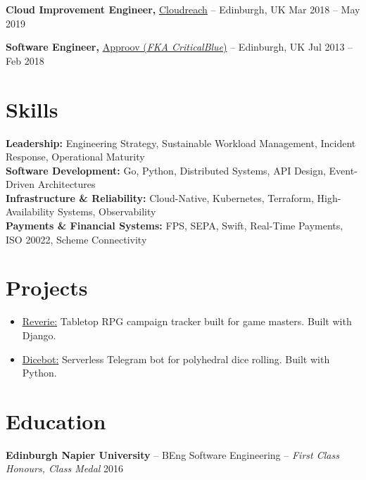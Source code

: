 \documentclass[11pt]{article}       %
\begin{document}
\textbf{Cloud Improvement Engineer,} \href{https://eviden.com/about-us/legacy-brands/cloudreach/}{Cloudreach} -- Edinburgh, UK \hfill Mar 2018 -- May 2019 \\
\vspace{6.5pt}

\textbf{Software Engineer,} \href{https://approov.io/}{Approov (\textit{FKA CriticalBlue})} -- Edinburgh, UK \hfill Jul 2013 -- Feb 2018 \\ 
\vspace{-9pt}


\section*{Skills}
\textbf{Leadership:} Engineering Strategy, Sustainable Workload Management, Incident Response, Operational Maturity \\
\textbf{Software Development:} Go, Python, Distributed Systems, API Design, Event-Driven Architectures \\
\textbf{Infrastructure \& Reliability:} Cloud-Native, Kubernetes, Terraform, High-Availability Systems, Observability \\
\textbf{Payments \& Financial Systems:} FPS, SEPA, Swift, Real-Time Payments, ISO 20022, Scheme Connectivity


\vspace{-6.5pt}

\section*{Projects}
\begin{itemize}
  \item \underline{\href{https://github.com/oneirism/reverie}{Reverie}:} Tabletop RPG campaign tracker built for game masters. Built with Django.
  \item \underline{\href{https://github.com/oneirism/dicebot}{Dicebot}:} Serverless Telegram bot for polyhedral dice rolling. Built with Python.
\end{itemize}

\vspace{-18.5pt}

\section*{Education}
\textbf{Edinburgh Napier University} -- BEng Software Engineering -- \textit{First Class Honours, Class Medal} \hfill 2016 \\

\vspace{-6.5pt}

\printbibliography[title=Citations]
\end{document}
